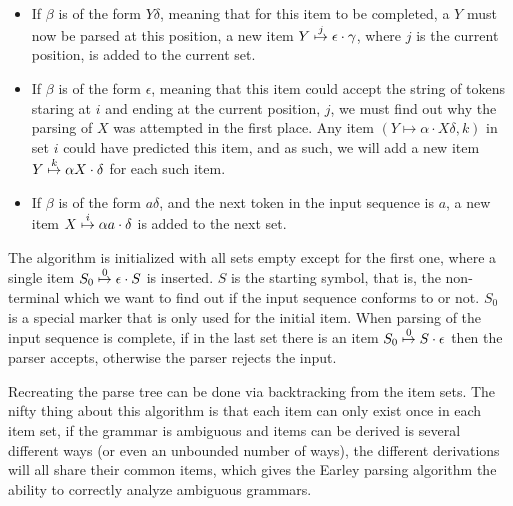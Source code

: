 		\begin{itemize}
			\item

				If $\beta$ is of the form $Y\delta$, meaning that for this item
				to be completed, a $Y$ must now be parsed at this position, a
				new item $\earley{Y}{\epsilon}{\gamma}{j}$, where $j$ is the
				current position, is added to the current set.

			\item

				If $\beta$ is of the form $\epsilon$, meaning that this item
				could accept the string of tokens staring at $i$ and ending at
				the current position, $j$, we must find out why the parsing of
				$X$ was attempted in the first place. Any item $(Y \mapsto
				\alpha \cdot X\delta, k)$ in set $i$  could have predicted this
				item, and as such, we will add a new item $\earley{Y}{\alpha
				X}{\delta}{k}$ for each such item.

			\item

				If $\beta$ is of the form $a\delta$, and the next token in the
				input sequence is $a$, a new item
				$\earley{X}{\alpha a}{\delta}{i}$ is added to the next
				set.

		\end{itemize}

		The algorithm is initialized with all sets empty except for the first
		one, where a single item $\earley{S_0}{\epsilon}{S}{0}$ is
		inserted.  $S$ is the starting symbol, that is, the non-terminal which
		we want to find out if the input sequence conforms to or not. $S_0$ is
		a special marker that is only used for the initial item. When parsing
		of the input sequence is complete, if in the last set there is an item
		$\earley{S_0}{S}{\epsilon}{0}$ then the parser accepts, otherwise
		the parser rejects the input.

		Recreating the parse tree can be done via backtracking from the item
		sets. The nifty thing about this algorithm is that
                each item can only
		exist once in each item set, if the grammar is ambiguous and items can
		be derived is several different ways (or even an unbounded number of
		ways), the different derivations will all share their common items,
		which gives the Earley parsing algorithm the ability to correctly
		analyze ambiguous grammars.


